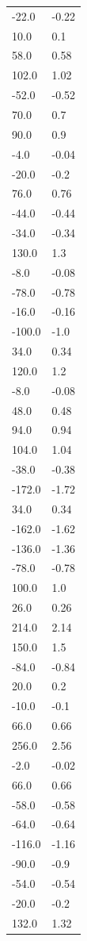 \begin{longtable}{ll}
-22.0 & -0.22 \\
10.0 & 0.1 \\
58.0 & 0.58 \\
102.0 & 1.02 \\
-52.0 & -0.52 \\
70.0 & 0.7 \\
90.0 & 0.9 \\
-4.0 & -0.04 \\
-20.0 & -0.2 \\
76.0 & 0.76 \\
-44.0 & -0.44 \\
-34.0 & -0.34 \\
130.0 & 1.3 \\
-8.0 & -0.08 \\
-78.0 & -0.78 \\
-16.0 & -0.16 \\
-100.0 & -1.0 \\
34.0 & 0.34 \\
120.0 & 1.2 \\
-8.0 & -0.08 \\
48.0 & 0.48 \\
94.0 & 0.94 \\
104.0 & 1.04 \\
-38.0 & -0.38 \\
-172.0 & -1.72 \\
34.0 & 0.34 \\
-162.0 & -1.62 \\
-136.0 & -1.36 \\
-78.0 & -0.78 \\
100.0 & 1.0 \\
26.0 & 0.26 \\
214.0 & 2.14 \\
150.0 & 1.5 \\
-84.0 & -0.84 \\
20.0 & 0.2 \\
-10.0 & -0.1 \\
66.0 & 0.66 \\
256.0 & 2.56 \\
-2.0 & -0.02 \\
66.0 & 0.66 \\
-58.0 & -0.58 \\
-64.0 & -0.64 \\
-116.0 & -1.16 \\
-90.0 & -0.9 \\
-54.0 & -0.54 \\
-20.0 & -0.2 \\
132.0 & 1.32 \\

\end{longtable}
